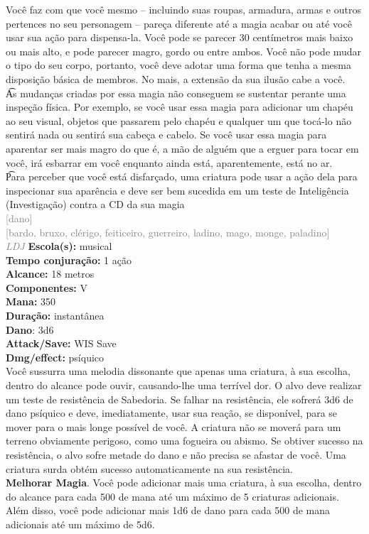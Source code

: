 \documentclass{RPG_Adventure}[2021/10/20]
\begin{document}
{\normalsize Você faz com que você mesmo – incluindo suas roupas, armadura, armas e outros pertences no seu personagem – pareça diferente até a magia acabar ou até você usar sua ação para dispensa-la. Você pode se parecer 30 centímetros mais baixo ou mais alto, e pode parecer magro, gordo ou entre ambos. Você não pode mudar o tipo do seu corpo, portanto, você deve adotar uma forma que tenha a mesma disposição básica de membros. No mais, a extensão da sua ilusão cabe a você.\\\t As mudanças criadas por essa magia não conseguem se sustentar perante uma inspeção física. Por exemplo, se você usar essa magia para adicionar um chapéu ao seu visual, objetos que passarem pelo chapéu e qualquer um que tocá-lo não sentirá nada ou sentirá sua cabeça e cabelo. Se você usar essa magia para aparentar ser mais magro do que é, a mão de alguém que a erguer para tocar em você, irá esbarrar em você enquanto ainda está, aparentemente, está no ar.\\\t Para perceber que você está disfarçado, uma criatura pode usar a ação dela para inspecionar sua aparência e deve ser bem sucedida em um teste de Inteligência (Investigação) contra a CD da sua magia\\}
{\scriptsize \textcolor{gray}{[dano]\\}}
{\scriptsize \textcolor{gray}{[bardo, bruxo, clérigo, feiticeiro, guerreiro, ladino, mago, monge, paladino]\\}}
{\tiny \textcolor{gray}{\textit{LDJ}}}
{\small \t \textbf{Escola(s):} musical\\\t \textbf{Tempo conjuração:} 1 ação\\\t \textbf{Alcance:} 18 metros\\\t \textbf{Componentes:} V\\\t \textbf{Mana:} 350\\\t \textbf{Duração:} instantânea\\\t \textbf{Dano}: 3d6\\\t \textbf{Attack/Save:} WIS Save\\\t \textbf{Dmg/effect:} psíquico\\}
{\normalsize Você sussurra uma melodia dissonante que apenas uma criatura, à sua escolha, dentro do alcance pode ouvir, causando-lhe uma terrível dor. O alvo deve realizar um teste de resistência de Sabedoria. Se falhar na resistência, ele sofrerá 3d6 de dano psíquico e deve, imediatamente, usar sua reação, se disponível, para se mover para o mais longe possível de você. A criatura não se moverá para um terreno obviamente perigoso, como uma fogueira ou abismo. Se obtiver sucesso na resistência, o alvo sofre metade do dano e não precisa se afastar de você. Uma criatura surda obtém sucesso automaticamente na sua resistência.\\\t \textbf{Melhorar Magia}. Você pode adicionar mais uma criatura, à sua escolha, dentro do alcance para cada 500 de mana até um máximo de 5 criaturas adicionais. Além disso, você pode adicionar mais 1d6 de dano para cada 500 de mana adicionais até um máximo de 5d6.\\}
\end{document}
